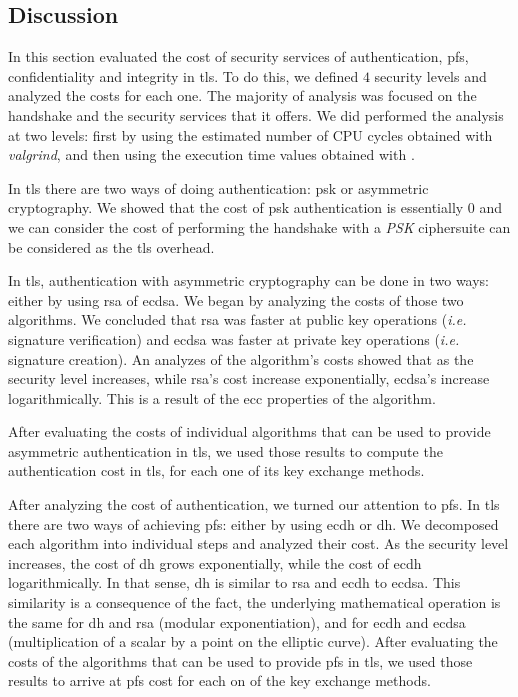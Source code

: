 \documentclass{llncs}
\begin{document}
\subsection{Discussion} \label{sec:ss-cost-conclusions}

In this section evaluated the cost of security services of authentication, \gls{pfs}, confidentiality and integrity
in \gls{tls}. To do this, we defined $4$ security levels and analyzed the costs for each one. The majority of
analysis was focused on the handshake and the security services that it offers. We did performed the analysis at
two levels: first by using the estimated number of CPU cycles obtained with \textit{valgrind}, and then using the
execution time values obtained with .

In \gls{tls} there are two ways of doing authentication: \gls{psk} or asymmetric cryptography. We showed that the
cost of \gls{psk} authentication is essentially $0$ and we can consider the cost of performing the 
handshake with a \textit{PSK} ciphersuite can be considered as the \gls{tls} overhead.

In \gls{tls}, authentication with asymmetric cryptography can be done in two ways: either by using \gls{rsa}
of \gls{ecdsa}. We began by analyzing the costs of those two algorithms. We concluded that \gls{rsa} was
faster at public key operations (\textit{i.e.} signature verification) and \gls{ecdsa} was faster at private key
operations (\textit{i.e.} signature creation). An analyzes of the algorithm's costs showed that as the security level
increases, while \gls{rsa}'s cost increase exponentially, \gls{ecdsa}'s increase logarithmically. This is a result of the
\gls{ecc} properties of the algorithm.

After evaluating the costs of individual algorithms that can be used to provide asymmetric authentication in \gls{tls}, we
used those results to compute the authentication cost in \gls{tls}, for each one of its key exchange methods.

After analyzing the cost of authentication, we turned our attention to \gls{pfs}. In \gls{tls} there are two ways
of achieving \gls{pfs}: either by using \gls{ecdh} or \gls{dh}. We decomposed each algorithm into individual steps
and analyzed their cost. As the security level increases, the cost of \gls{dh} grows exponentially, while the cost
of \gls{ecdh} logarithmically. In that sense, \gls{dh} is similar to \gls{rsa} and \gls{ecdh} to \gls{ecdsa}.
This similarity is a consequence of the fact, the underlying mathematical operation is the same for \gls{dh} and
\gls{rsa} (modular exponentiation), and for \gls{ecdh} and \gls{ecdsa} (multiplication of a scalar by a point on 
the elliptic curve). After evaluating the costs of the algorithms that can be used to provide \gls{pfs} in \gls{tls}, we used those results
to arrive at \gls{pfs} cost for each on of the key exchange methods.
\end{document}
